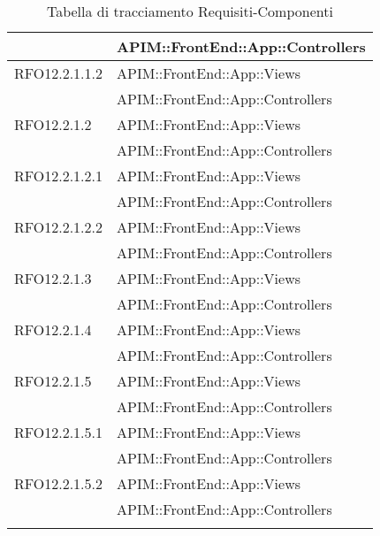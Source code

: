 \begin{longtable}{ p{4cm} | p{12cm} }
			& APIM::FrontEnd::App::Controllers \\
			\hline
			RFO12.2.1.1.2
			& APIM::FrontEnd::App::Views \\
			& APIM::FrontEnd::App::Controllers \\
			\hline
			RFO12.2.1.2
			& APIM::FrontEnd::App::Views \\
			& APIM::FrontEnd::App::Controllers \\
			\hline
			RFO12.2.1.2.1
			& APIM::FrontEnd::App::Views \\
			& APIM::FrontEnd::App::Controllers \\
			\hline
			RFO12.2.1.2.2	
			& APIM::FrontEnd::App::Views \\
			& APIM::FrontEnd::App::Controllers \\
			\hline
			RFO12.2.1.3	
			& APIM::FrontEnd::App::Views \\
			& APIM::FrontEnd::App::Controllers \\
			\hline
			RFO12.2.1.4
			& APIM::FrontEnd::App::Views \\
			& APIM::FrontEnd::App::Controllers \\
			\hline
			RFO12.2.1.5
			& APIM::FrontEnd::App::Views \\
			& APIM::FrontEnd::App::Controllers \\
			\hline
			RFO12.2.1.5.1
			& APIM::FrontEnd::App::Views \\
			& APIM::FrontEnd::App::Controllers \\
			\hline
			RFO12.2.1.5.2
			& APIM::FrontEnd::App::Views \\
			& APIM::FrontEnd::App::Controllers \\
			\hline
			
			\caption{Tabella di tracciamento Requisiti-Componenti}
		\end{longtable}
